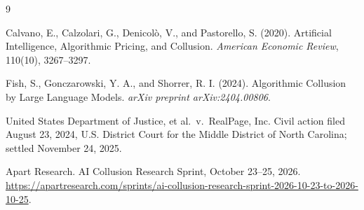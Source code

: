 \documentclass[11pt]{article}
\begin{document}

\begin{thebibliography}{9}

Calvano, E., Calzolari, G., Denicol\`o, V., and Pastorello, S. (2020).
\newblock Artificial Intelligence, Algorithmic Pricing, and Collusion.
\newblock \emph{American Economic Review}, 110(10), 3267--3297.

Fish, S., Gonczarowski, Y. A., and Shorrer, R. I. (2024).
\newblock Algorithmic Collusion by Large Language Models.
\newblock \emph{arXiv preprint arXiv:2404.00806}.

United States Department of Justice, et al.\ v.\ RealPage, Inc.
\newblock Civil action filed August 23, 2024, U.S. District Court for the Middle District of North Carolina; settled November 24, 2025.

Apart Research.
\newblock AI Collusion Research Sprint, October 23--25, 2026.
\newblock \url{https://apartresearch.com/sprints/ai-collusion-research-sprint-2026-10-23-to-2026-10-25}.

\end{thebibliography}
\end{document}
